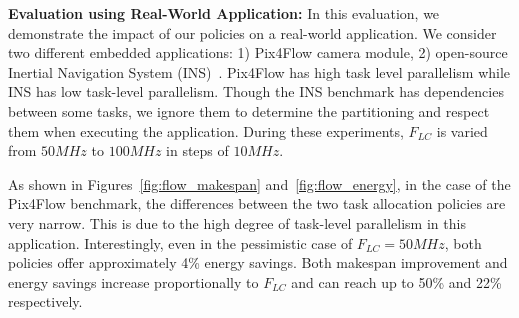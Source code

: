 \noindent\textbf{Evaluation using Real-World Application:} In this evaluation, we demonstrate the impact of our policies on a real-world application. 
We consider two different embedded applications: 1) Pix4Flow \cite{Pix4Flow} camera module, 2) open-source Inertial Navigation System (INS)~\cite{INS}. Pix4Flow has high task level parallelism while INS has low task-level parallelism. Though the INS benchmark has dependencies between some tasks, we ignore them to determine the partitioning and respect them when executing the application. During these experiments, $F_{LC}$ is varied from $50MHz$ to $100MHz$ in steps of $10MHz$. %

As shown in Figures~\ref{fig:flow_makespan} and~\ref{fig:flow_energy}, in the case of the Pix4Flow benchmark, the differences between the two task allocation policies are very narrow. This is due to the high degree of task-level parallelism in this application. Interestingly, even in the pessimistic case of $F_{LC} = 50MHz$, both  policies offer approximately 4\% energy savings. Both makespan improvement and energy savings increase proportionally to $F_{LC}$ and can reach up to 50\% and 22\% respectively. %


